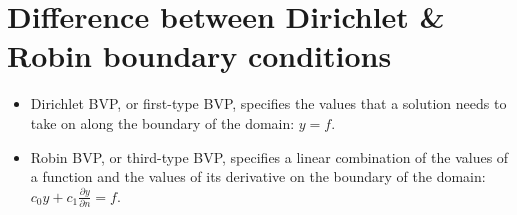 \section{Difference between Dirichlet \& Robin boundary conditions}
	\begin{itemize}
		\item{Dirichlet BVP, or first-type BVP, specifies the values that a solution needs to take on along the boundary of the domain: $y = f$. }
		\item{Robin BVP, or third-type BVP, specifies a linear combination of the values of a function and the values of its derivative on the boundary of the domain: $c_{0}y+c_{1}\frac{\partial y}{\partial n}=f$.}
	\end{itemize}

